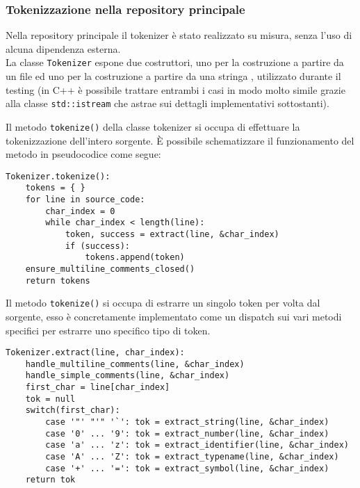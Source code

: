 \subsubsection{Tokenizzazione nella repository principale}
Nella repository principale il tokenizer
è stato realizzato su misura, senza l'uso di alcuna
dipendenza esterna. \\

La classe \texttt{Tokenizer} espone due costruttori, 
uno per la costruzione a partire da un file ed uno 
per la costruzione a partire da una stringa 
, utilizzato durante il testing (in C++ è possibile 
trattare entrambi i casi in modo molto simile grazie
alla classe \texttt{std::istream} che astrae sui 
dettagli implementativi sottostanti).

Il metodo \texttt{tokenize()} della classe tokenizer 
si occupa di effettuare la tokenizzazione dell'intero sorgente. È
possibile schematizzare il funzionamento del metodo in pseudocodice come segue:

\vspace{0.5cm}
\begin{lstlisting}[frame=single]
Tokenizer.tokenize():
    tokens = { }
    for line in source_code:
        char_index = 0
        while char_index < length(line):
            token, success = extract(line, &char_index)
            if (success): 
                tokens.append(token)
    ensure_multiline_comments_closed()
    return tokens
\end{lstlisting}
\vspace{0.5cm}

Il metodo \texttt{tokenize()} si occupa di estrarre un singolo token 
per volta dal sorgente, esso è concretamente implementato come un dispatch 
sui vari metodi specifici per estrarre uno specifico tipo di token.

\vspace{0.5cm}
\begin{lstlisting}[frame=single]
Tokenizer.extract(line, char_index):
    handle_multiline_comments(line, &char_index)
    handle_simple_comments(line, &char_index)
    first_char = line[char_index]
    tok = null
    switch(first_char):
        case '"' "'" '`': tok = extract_string(line, &char_index)
        case '0' ... '9': tok = extract_number(line, &char_index)
        case 'a' ... 'z': tok = extract_identifier(line, &char_index)
        case 'A' ... 'Z': tok = extract_typename(line, &char_index)
        case '+' ... '=': tok = extract_symbol(line, &char_index)
    return tok
\end{lstlisting}    
\vspace{0.5cm}

